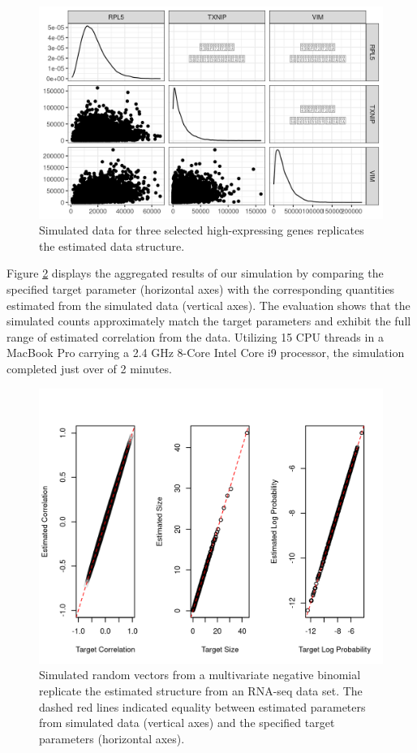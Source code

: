 \documentclass[]{article}
\begin{document}
\begin{figure}

{\centering \includegraphics[width=0.85\linewidth]{fig/ch050-simDataFig} 

}

\caption{Simulated data for three selected high-expressing genes replicates the estimated data structure.}\label{fig:ch050-simDataFig}
\end{figure}

Figure \ref{fig:ch050-figBRCA} displays the aggregated results of our simulation by comparing the specified target parameter (horizontal axes) with the corresponding quantities estimated from the simulated data (vertical axes).
The evaluation shows that the simulated counts approximately match the target parameters and exhibit the full range of estimated correlation from the data.
Utilizing 15 CPU threads in a MacBook Pro carrying a 2.4 GHz 8-Core Intel Core i9 processor, the simulation completed just over of 2 minutes.

\begin{figure}

{\centering \includegraphics[width=0.8\linewidth]{fig/ch050-figBRCA} 

}

\caption{Simulated random vectors from a multivariate negative binomial replicate the estimated structure from an RNA-seq data set. The dashed red lines indicated equality between estimated parameters from simulated data (vertical axes) and the specified target parameters (horizontal axes).}\label{fig:ch050-figBRCA}
\end{figure}
\end{document}
